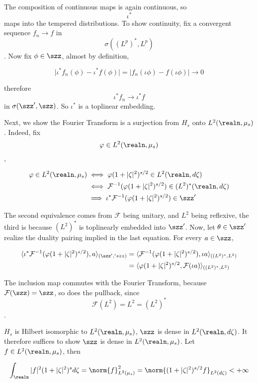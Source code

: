 The composition of continuous maps is again continuous, so \[\iota^*\]
maps into the tempered distributions. To show continuity, fix a
convergent sequence \(f_n\to f\) in \[\sigma((L^p)^*, L^p)\]. Now fix
\(\phi\in \szz\), almost by definition,

\[
\vert \iota^*f_n(\phi) - \iota^*f(\phi)\vert = \vert f_n(\iota\phi) - f(\iota\phi)\vert\to 0
\]

therefore \[\iota^*f_n\to \iota^*f\] in \(\sigma(\szz', \szz)\). So
\(\iota^*\) is a toplinear embedding.

Next, we show the Fourier Transform is a surjection from \(H_s\) onto
\(L^2(\realn,\mu_s)\). Indeed, fix \[\varphi\in L^2(\realn,\mu_s)\],

\[
\begin{align}
\varphi\in L^2(\realn,\mu_s)&\iff \varphi(1+\vert\zeta\vert^2)^{s/2}\in L^2(\realn, d\zeta)\\
&\iff \mathcal{F}^{-1}(\varphi(1+\vert\zeta\vert^2)^{s/2} )\in (L^2)^*(\realn,d\zeta)\\
&\implies \iota^*\mathcal{F}^{-1}(\varphi(1+\vert\zeta\vert^2)^{s/2} )\in \szz' 
\end{align}
\]

The second equivalence comes from \(\mathcal{F}\) being unitary, and
\(L^2\) being reflexive, the third is because \((L^2)^*\) is toplinearly
embedded into \(\szz'\). Now, let \(\theta\in\szz'\) realize the duality
pairing implied in the last equation. For every \(a\in \szz\),

\[
\begin{align}
\langle \iota^*\mathcal{F}^{-1}(\varphi(1+\vert\zeta\vert^2)^{s/2}), a\rangle_{(\szz','szz)} &=\langle \mathcal{F}^{-1}(\varphi(1+\vert\zeta\vert^2)^{s/2}),\iota a\rangle_{((L^2)^*, L^2)}\\
&=\langle \varphi(1+\vert\zeta\vert^2)^{s/2},\mathcal{F}(\iota a)\rangle_{((L^2)^*, L^2)}
\end{align}
\]

The inclusion map commutes with the Fourier Transform, because
\(\mathcal{F}(\szz) = \szz\), so does the pullback, since
\[\mathcal{F}(L^2) = L^2 = (L^2)^*\].

\(H_s\) is Hilbert isomorphic to \(L^2(\realn,\mu_s)\), \(\szz\) is
dense in \(L^2(\realn,d\zeta)\). It therefore suffices to show \(\szz\)
is dense in \(L^2(\realn, \mu_s)\). Let \(f\in L^2(\realn,\mu_s)\), then

\[
\int_{\realn}\vert f\vert^2 (1+\vert\zeta\vert^2)^{s}d\zeta = \norm{f}^2_{L^2(\mu_s)} = \norm{(1+\vert\zeta\vert^2)^{s/2} f}_{L^2(d\zeta)}<+\infty
\]

